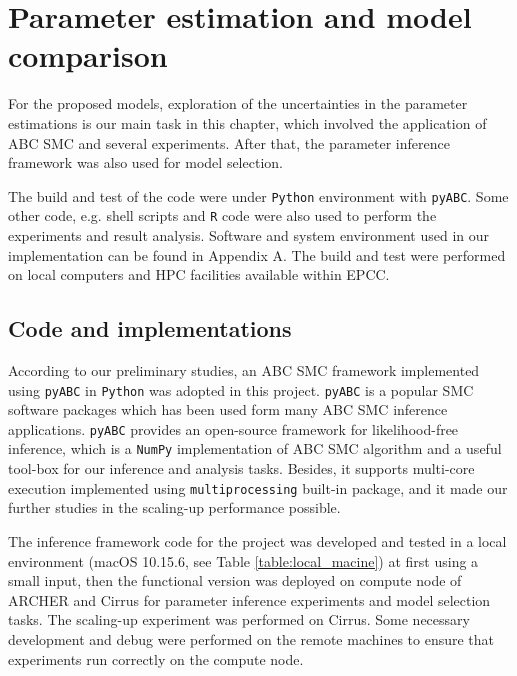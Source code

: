 \chapter{Parameter estimation and model comparison}

For the proposed models, exploration of the uncertainties in the parameter estimations is our main task in this chapter, which involved the application of ABC SMC and several experiments. After that, the parameter inference framework was also used for model selection.

The build and test of the code were under \verb|Python| environment with \verb|pyABC|\cite{ref:pyabc}. Some other code, e.g. shell scripts and \verb|R| code were also used to perform the experiments and result analysis. Software and system environment used in our implementation can be found in Appendix A. The build and test were performed on local computers and HPC facilities available within EPCC.

\section{Code and implementations}




According to our preliminary studies, an ABC SMC framework implemented using \verb|pyABC| in \verb|Python| was adopted in this project. \verb|pyABC| is a popular SMC software packages\cite{ref:pyabc} which has been used form many ABC SMC inference applications\cite{population}. \verb|pyABC| provides an open-source framework for likelihood-free inference, which is a \verb|NumPy| implementation of ABC SMC algorithm and a useful tool-box for our inference and analysis tasks. Besides, it supports multi-core execution implemented using \verb|multiprocessing| built-in package, and it made our further studies in the scaling-up performance possible.

The inference framework code for the project was developed and tested in a local environment (macOS 10.15.6, see Table \ref{table:local_macine}) at first using a small input, then the functional version was deployed on compute node of ARCHER and Cirrus for parameter inference experiments and model selection tasks. The scaling-up experiment was performed on Cirrus. 
Some necessary development and debug were performed on the remote machines to ensure that experiments run correctly on the compute node.

